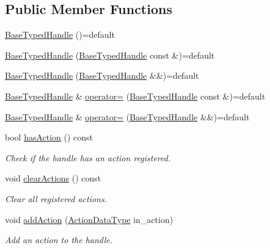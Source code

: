 \subsection*{Public Member Functions}
\begin{DoxyCompactItemize}
\item 
\hyperlink{structvt_1_1rdma_1_1_base_typed_handle_a268fefeb75b88a7642ac14d06b5da963}{Base\+Typed\+Handle} ()=default
\item 
\hyperlink{structvt_1_1rdma_1_1_base_typed_handle_adfa889759392da4cdcea27e79e81a12f}{Base\+Typed\+Handle} (\hyperlink{structvt_1_1rdma_1_1_base_typed_handle}{Base\+Typed\+Handle} const \&)=default
\item 
\hyperlink{structvt_1_1rdma_1_1_base_typed_handle_a89f1a34092464da223bc474deca0692e}{Base\+Typed\+Handle} (\hyperlink{structvt_1_1rdma_1_1_base_typed_handle}{Base\+Typed\+Handle} \&\&)=default
\item 
\hyperlink{structvt_1_1rdma_1_1_base_typed_handle}{Base\+Typed\+Handle} \& \hyperlink{structvt_1_1rdma_1_1_base_typed_handle_af7897dce38a16c31e3431cf65dec2792}{operator=} (\hyperlink{structvt_1_1rdma_1_1_base_typed_handle}{Base\+Typed\+Handle} const \&)=default
\item 
\hyperlink{structvt_1_1rdma_1_1_base_typed_handle}{Base\+Typed\+Handle} \& \hyperlink{structvt_1_1rdma_1_1_base_typed_handle_a4f4dd9c546b56d3fc570500a79b048d8}{operator=} (\hyperlink{structvt_1_1rdma_1_1_base_typed_handle}{Base\+Typed\+Handle} \&\&)=default
\item 
bool \hyperlink{structvt_1_1rdma_1_1_base_typed_handle_a465a9836d31034a5f96b5826ae3ba064}{has\+Action} () const
\begin{DoxyCompactList}\small\item\em Check if the handle has an action registered. \end{DoxyCompactList}\item 
void \hyperlink{structvt_1_1rdma_1_1_base_typed_handle_a48b8d5baf7532ee63c078d55ee90d6fe}{clear\+Actions} () const
\begin{DoxyCompactList}\small\item\em Clear all registered actions. \end{DoxyCompactList}\item 
void \hyperlink{structvt_1_1rdma_1_1_base_typed_handle_a7898a65aac6b27f5265ca3d0c2fa187a}{add\+Action} (\hyperlink{structvt_1_1rdma_1_1_base_typed_handle_a20c231fb671a38c3bb761d613dd42b3c}{Action\+Data\+Type} in\+\_\+action)
\begin{DoxyCompactList}\small\item\em Add an action to the handle. \end{DoxyCompactList}\item 

\end{DoxyCompactItemize}
